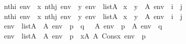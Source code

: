 \begin{isabelle}%
{\isasymlbrakk}nth{\isacharparenleft}{\kern0pt}i{\isacharcomma}{\kern0pt}\ env{\isacharparenright}{\kern0pt}\ {\isacharequal}{\kern0pt}\ x{\isacharsemicolon}{\kern0pt}\ nth{\isacharparenleft}{\kern0pt}j{\isacharcomma}{\kern0pt}\ env{\isacharparenright}{\kern0pt}\ {\isacharequal}{\kern0pt}\ y{\isacharsemicolon}{\kern0pt}\ env\ {\isasymin}\ list{\isacharparenleft}{\kern0pt}A{\isacharparenright}{\kern0pt}{\isasymrbrakk}\isanewline
{\isasymLongrightarrow}\ x\ {\isasymin}\ y\ {\isasymlongleftrightarrow}\ A{\isacharcomma}{\kern0pt}\ env\ {\isasymTurnstile}\ {\isasymcdot}i\ {\isasymin}\ j{\isasymcdot}\isasep\isanewline\isanewline%
{\isasymlbrakk}nth{\isacharparenleft}{\kern0pt}i{\isacharcomma}{\kern0pt}\ env{\isacharparenright}{\kern0pt}\ {\isacharequal}{\kern0pt}\ x{\isacharsemicolon}{\kern0pt}\ nth{\isacharparenleft}{\kern0pt}j{\isacharcomma}{\kern0pt}\ env{\isacharparenright}{\kern0pt}\ {\isacharequal}{\kern0pt}\ y{\isacharsemicolon}{\kern0pt}\ env\ {\isasymin}\ list{\isacharparenleft}{\kern0pt}A{\isacharparenright}{\kern0pt}{\isasymrbrakk}\isanewline
{\isasymLongrightarrow}\ x\ {\isacharequal}{\kern0pt}\ y\ {\isasymlongleftrightarrow}\ A{\isacharcomma}{\kern0pt}\ env\ {\isasymTurnstile}\ {\isasymcdot}i\ {\isacharequal}{\kern0pt}\ j{\isasymcdot}\isasep\isanewline\isanewline%
env\ {\isasymin}\ list{\isacharparenleft}{\kern0pt}A{\isacharparenright}{\kern0pt}\ {\isasymLongrightarrow}\ {\isacharparenleft}{\kern0pt}A{\isacharcomma}{\kern0pt}\ env\ {\isasymTurnstile}\ {\isasymcdot}{\isasymnot}{\isacharparenleft}{\kern0pt}p\ {\isasymand}\ q{\isacharparenright}{\kern0pt}{\isasymcdot}{\isacharparenright}{\kern0pt}\ {\isasymlongleftrightarrow}\ {\isasymnot}\ {\isacharparenleft}{\kern0pt}{\isacharparenleft}{\kern0pt}A{\isacharcomma}{\kern0pt}\ env\ {\isasymTurnstile}\ p{\isacharparenright}{\kern0pt}\ {\isasymand}\ {\isacharparenleft}{\kern0pt}A{\isacharcomma}{\kern0pt}\ env\ {\isasymTurnstile}\ q{\isacharparenright}{\kern0pt}{\isacharparenright}{\kern0pt}\isasep\isanewline\isanewline%
env\ {\isasymin}\ list{\isacharparenleft}{\kern0pt}A{\isacharparenright}{\kern0pt}\ {\isasymLongrightarrow}\ {\isacharparenleft}{\kern0pt}A{\isacharcomma}{\kern0pt}\ env\ {\isasymTurnstile}\ {\isacharparenleft}{\kern0pt}{\isasymcdot}{\isasymforall}p{\isasymcdot}{\isacharparenright}{\kern0pt}{\isacharparenright}{\kern0pt}\ {\isasymlongleftrightarrow}\ {\isacharparenleft}{\kern0pt}{\isasymforall}x{\isasymin}A{\isachardot}{\kern0pt}\ A{\isacharcomma}{\kern0pt}\ Cons{\isacharparenleft}{\kern0pt}x{\isacharcomma}{\kern0pt}\ env{\isacharparenright}{\kern0pt}\ {\isasymTurnstile}\ p{\isacharparenright}{\kern0pt}%
\end{isabelle}%
